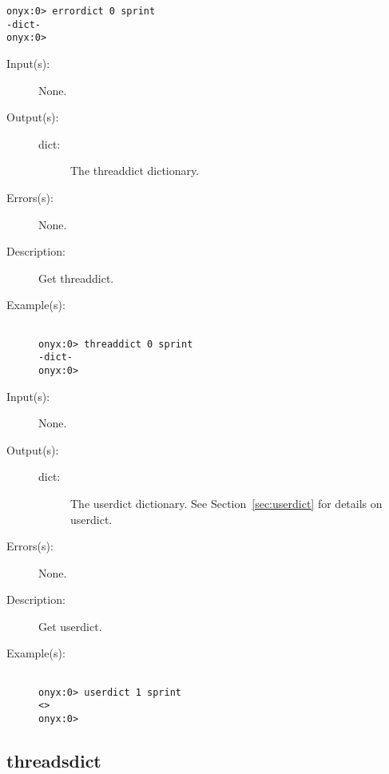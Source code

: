 \begin{description}
\begin{description}
\begin{verbatim}
onyx:0> errordict 0 sprint
-dict-
onyx:0>
		\end{verbatim}
	\end{description}
\label{threaddict:threaddict}
\item[{\onyxop{--}{threaddict}{dict}}: ]
	\begin{description}\item[]
	\item[Input(s): ] None.
	\item[Output(s): ]
		\begin{description}\item[]
		\item[dict: ]
			The threaddict dictionary.
		\end{description}
	\item[Errors(s): ] None.
	\item[Description: ]
		Get threaddict.
	\item[Example(s): ]\begin{verbatim}

onyx:0> threaddict 0 sprint
-dict-
onyx:0>
		\end{verbatim}
	\end{description}
\label{threaddict:userdict}
\item[{\onyxop{--}{userdict}{dict}}: ]
	\begin{description}\item[]
	\item[Input(s): ] None.
	\item[Output(s): ]
		\begin{description}\item[]
		\item[dict: ]
			The userdict dictionary.  See
			Section~\ref{sec:userdict} for details on userdict.
		\end{description}
	\item[Errors(s): ] None.
	\item[Description: ]
		Get userdict.
	\item[Example(s): ]\begin{verbatim}

onyx:0> userdict 1 sprint
<>
onyx:0>
		\end{verbatim}
	\end{description}
\end{description}

\subsection{threadsdict}
\label{sec:threadsdict}

